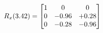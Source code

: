 \documentclass[preview]{standalone}
\begin{document}
\begin{align*}
\special{dvisvgm:raw <g id='unique000'>}R_{x}(3.42) = \begin{bmatrix}1 & 0 & 0 \\0 & -0.96 & +0.28 \\0 & -0.28 & -0.96\end{bmatrix}\special{dvisvgm:raw </g>}
\end{align*}
\end{document}
